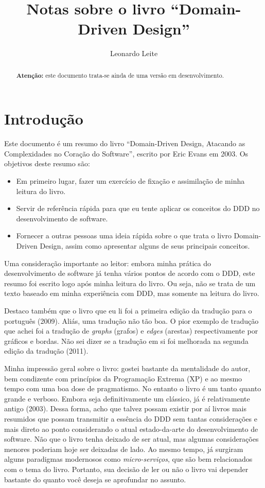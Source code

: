 \documentclass[a4paper, 12pt]{article}
\title{Notas sobre o livro ``Domain-Driven Design''}
\author{Leonardo Leite}
\begin{document}
\maketitle

\begin{abstract}
\textbf{Atenção: } este documento trata-se ainda de uma versão em desenvolvimento.
\end{abstract}



\section{Introdução}

Este documento é um resumo do livro ``Domain-Driven Design, Atacando as Complexidades no Coração do Software'', escrito por Eric Evans em 2003. Os objetivos deste resumo são:

\begin{itemize}
\item Em primeiro lugar, fazer um exercício de fixação e assimilação de minha leitura do livro.
\item Servir de referência rápida para que eu tente aplicar os conceitos do DDD no desenvolvimento de software.
\item Fornecer a outras pessoas uma ideia rápida sobre o que trata o livro Domain-Driven Design, assim como apresentar alguns de seus principais conceitos.
\end{itemize}

Uma consideração importante ao leitor: embora minha prática do desenvolvimento de software já tenha vários pontos de acordo com o DDD, este resumo foi escrito logo após minha leitura do livro. Ou seja, não se trata de um texto baseado em minha experiência com DDD, mas somente na leitura do livro.

Destaco também que o livro que eu li foi a primeira edição da tradução para o português (2009). Aliás, uma tradução não tão boa. O pior exemplo de tradução que achei foi a tradução de \emph{graphs} (grafos) e \emph{edges} (arestas) respectivamente por gráficos e bordas. Não sei dizer se a tradução em si foi melhorada na segunda edição da tradução (2011).

Minha impressão geral sobre o livro: gostei bastante da mentalidade do autor, bem condizente com princípios da Programação Extrema (XP) e ao mesmo tempo com uma boa dose de pragmatismo. No entanto o livro é um tanto quanto grande e verboso. Embora seja definitivamente um clássico, já é relativamente antigo (2003). Dessa forma, acho que talvez possam existir por aí livros mais resumidos que possam transmitir a essência do DDD sem tantas considerações e mais direto ao ponto considerando o atual estado-da-arte do desenvolvimento de software. Não que o livro tenha deixado de ser atual, mas algumas considerações menores poderiam hoje ser deixadas de lado. Ao mesmo tempo, já surgiram alguns paradigmas modernosos como \emph{micro-serviços}, que são bem relacionados com o tema do livro. Portanto, sua decisão de ler ou não o livro vai depender bastante do quanto você deseja se aprofundar no assunto.
\end{document}
